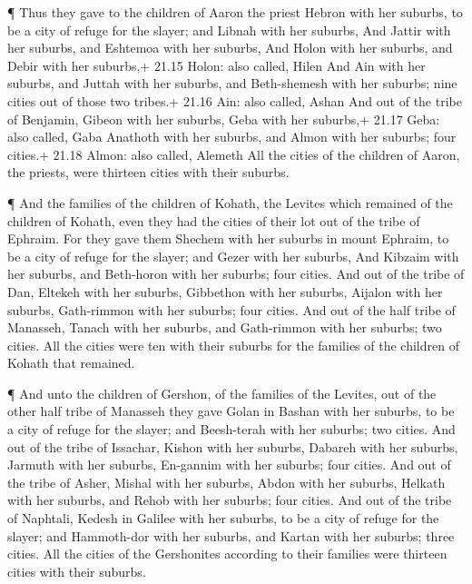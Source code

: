  ¶ Thus they gave to the children of Aaron the priest
Hebron with her suburbs, to be a city of refuge for the slayer; and
Libnah with her suburbs,  And Jattir with her suburbs, and
Eshtemoa with her suburbs,  And Holon with her suburbs, and
Debir with her suburbs,+ 21.15 Holon: also called, Hilen 
And Ain with her suburbs, and Juttah with her suburbs, and Beth-shemesh
with her suburbs; nine cities out of those two tribes.+ 21.16 Ain: also
called, Ashan  And out of the tribe of Benjamin, Gibeon
with her suburbs, Geba with her suburbs,+ 21.17 Geba: also called, Gaba
 Anathoth with her suburbs, and Almon with her suburbs;
four cities.+ 21.18 Almon: also called, Alemeth  All the
cities of the children of Aaron, the priests, were thirteen cities with
their suburbs.

 ¶ And the families of the children of Kohath, the Levites
which remained of the children of Kohath, even they had the cities of
their lot out of the tribe of Ephraim.  For they gave them
Shechem with her suburbs in mount Ephraim, to be a city of refuge for
the slayer; and Gezer with her suburbs,  And Kibzaim with
her suburbs, and Beth-horon with her suburbs; four cities. 
And out of the tribe of Dan, Eltekeh with her suburbs, Gibbethon with
her suburbs,  Aijalon with her suburbs, Gath-rimmon with
her suburbs; four cities.  And out of the half tribe of
Manasseh, Tanach with her suburbs, and Gath-rimmon with her suburbs; two
cities.  All the cities were ten with their suburbs for the
families of the children of Kohath that remained.

 ¶ And unto the children of Gershon, of the families of the
Levites, out of the other half tribe of Manasseh they gave Golan in
Bashan with her suburbs, to be a city of refuge for the slayer; and
Beesh-terah with her suburbs; two cities.  And out of the
tribe of Issachar, Kishon with her suburbs, Dabareh with her suburbs,
 Jarmuth with her suburbs, En-gannim with her suburbs; four
cities.  And out of the tribe of Asher, Mishal with her
suburbs, Abdon with her suburbs,  Helkath with her suburbs,
and Rehob with her suburbs; four cities.  And out of the
tribe of Naphtali, Kedesh in Galilee with her suburbs, to be a city of
refuge for the slayer; and Hammoth-dor with her suburbs, and Kartan with
her suburbs; three cities.  All the cities of the
Gershonites according to their families were thirteen cities with their
suburbs.

